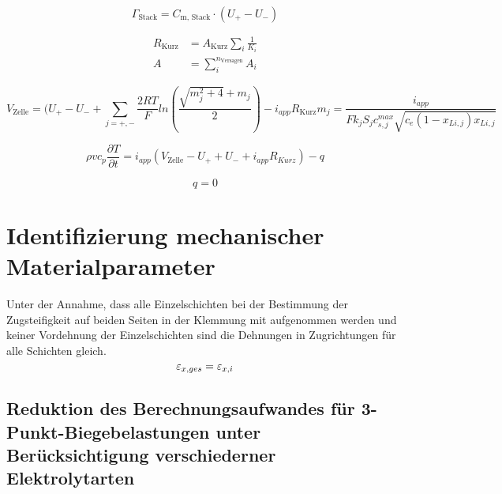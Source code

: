 \begin{equation}
    \Gamma_{\text{Stack}} = C_{\text{m, Stack}} \cdot \left(U_{+} - U_{-}\right)
\end{equation}

\begin{align}
    R_{\text{Kurz}} &= A_{\text{Kurz}} \sum_{i} \frac{1}{K_i}\\
    A &= \sum_{i}^{n_{\text{Versagen}}} A_{i}
\end{align}

\begin{equation}
    V_{\text{Zelle}} = (U_{+} - U_{-} + \sum_{j=+,-} \frac{2 RT}{F} ln\left(\frac{\sqrt{m_j^2 +4} + m_j}{2}\right) - i_{app} R_{\text{Kurz}}
    m_j = \frac{i_{app}}{F k_j S_j c_{s,j}^{max} \sqrt{c_e (1-x_{Li,j}) x_{Li,j}}} 
\end{equation}

\begin{equation}
    \rho v c_p \frac{\partial T}{\partial t} = i_{app}\left(V_{\text{Zelle}} - U_{+} + U_{-} + i_{app} R_{Kurz} \right) -q
\end{equation}

\begin{equation}
    q = 0
\end{equation}

\section{Identifizierung mechanischer Materialparameter}
Unter der Annahme, dass alle Einzelschichten bei der Bestimmung der Zugsteifigkeit auf beiden Seiten in der Klemmung mit aufgenommen werden und keiner Vordehnung der Einzelschichten sind die Dehnungen in Zugrichtungen für alle Schichten gleich.
\begin{equation}
    \varepsilon_{x,ges} = \varepsilon_{x,i}\\
\end{equation}



\subsection*{Reduktion des Berechnungsaufwandes für 3-Punkt-Biegebelastungen unter Berücksichtigung verschiederner Elektrolytarten}

